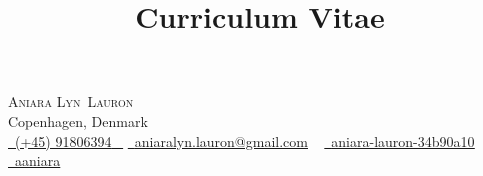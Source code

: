 \documentclass[a4paper,11pt,english,final,hidelinks]{curve}
\title{Curriculum Vitae}
\makeatletter
\newcommand{\firstname}{Aniara Lyn}
\newcommand{\lastname}{Lauron}
\newcommand{\address}{Copenhagen, Denmark}
\newcommand{\phoneno}{+4591806394}
\newcommand{\phonenoprint}{(+45) 91806394}
\newcommand{\email}{aniaralyn.lauron@gmail.com}
\newcommand{\linkedin}{aniara-lauron-34b90a10}
\newcommand{\github}{aaniara}
\makeatother
\begin{document}
\begin{center}
    {\LARGE \scshape \firstname~\lastname} \\
    \address \\
    \small \href{tel:\phoneno}{ \raisebox{-0.1\height}\faPhone\ \underline{\phonenoprint} ~} \href{mailto:\email}{\raisebox{-0.2\height}\faEnvelope\  \underline{\email}} ~ 
    \href{https://linkedin.com/in/\linkedin}{\raisebox{-0.2\height}\faLinkedin\ \underline{\linkedin}}  ~
    \href{https://github.com/\github}{\raisebox{-0.2\height}\faGithub\ \underline{\github}} ~
    \vspace{-5pt}
\end{center}


%

% 
\end{document}
